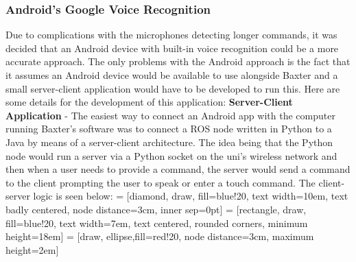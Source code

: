 \subsubsection{Android's Google Voice Recognition}
Due to complications with the microphones detecting longer commands, it was decided that an Android device with built-in voice recognition could be a more accurate approach. The only problems with the Android approach is the fact that it assumes an Android device would be available to use alongside Baxter and a small server-client application would have to be developed to run this. Here are some details for the development of this application:
\newline\newline
\textbf{Server-Client Application} -  The easiest way to connect an Android app with the computer running Baxter's software was to connect a ROS node written in Python to a Java by means of a server-client architecture. The idea being that the Python node would run a server via a Python socket on the uni's wireless network and then when a user needs to provide a command, the server would send a command to the client prompting the user to speak or enter a touch command. The client-server logic is seen below:
\newline\newline
{} = [diamond, draw, fill=blue!20, 
    text width=10em, text badly centered, node distance=3cm, inner sep=0pt]
 = [rectangle, draw, fill=blue!20, 
    text width=7em, text centered, rounded corners, minimum height=18em]
 = [draw, ellipse,fill=red!20, node distance=3cm,
    maximum height=2em]
